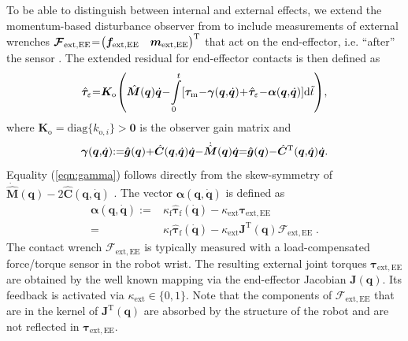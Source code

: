 To be able to distinguish between internal and external effects, we extend the momentum-based disturbance observer from \cite{DeLucaMat2003,DeLucaMat2004,Haddadin2014} to include measurements of external wrenches $\medmuskip=1.3mu
\thinmuskip=1.3mu
\thickmuskip=1.3mu
\bm{\mathcal{F}}_\mathrm{ext,EE}=\begin{pmatrix}\bm{f}_{\mathrm{ext,EE}} & \bm{m}_{\mathrm{ext,EE}}\end{pmatrix}^\mathrm{T}$ that act on the end-effector, i.e. ``after'' the sensor \cite{OttHenLee2013}.
The extended residual for end-effector contacts is then defined as
%
\begin{equation}
\medmuskip=0.5mu
\thinmuskip=0.5mu
\thickmuskip=0.5mu
\hat{\bm{\tau}}_\mathrm{\varepsilon}=\bm{K}_\mathrm{o}
\left(
\hat{\bm{M}}(\bm{q})\dot{\bm{q}}
-\int\limits_0^t
 [\bm{\tau}_\mathrm{m}
 -\bm{\gamma}(\bm{q},\dot{\bm{q}})
 +\hat{\bm{\tau}}_\mathrm{\varepsilon}
 -\bm{\alpha}(\bm{q},\dot{\bm{q}})
 ]\mathrm{d}\tilde{t} 
 \right),
\label{eqn:observer}
\end{equation}
%
where $\bm{K}_\mathrm{o}=\mathrm{diag}\{k_{\mathrm{o},i}\}>\bm{0}$ is the observer gain matrix and
\begin{equation}
\medmuskip=0.05mu
\thinmuskip=0.05mu
\thickmuskip=0.05mu
\bm{\gamma}(\bm{q},\dot{\bm{q}}):=
\hat{\bm{g}}(\bm{q})
+\hat{\bm{C}}(\bm{q},\dot{\bm{q}})\dot{\bm{q}}
-\dot{\hat{\bm{M}}}(\bm{q})\dot{\bm{q}}
=
\hat{\bm{g}}(\bm{q})-\hat{\bm{C}}^\mathrm{T}(\bm{q},\dot{\bm{q}})\dot{\bm{q}}\;.
\label{eqn:gamma}
\end{equation}
Equality (\ref{eqn:gamma}) follows directly from the skew-symmetry of $\dot{\hat{\bm{M}}}(\bm{q})-2\hat{\bm{C}}(\bm{q},\dot{\bm{q}})$ \cite{DeLucaAlbHadHir2006}. 
The vector $\bm{\alpha}(\bm{q},\dot{\bm{q}})$ is defined as 
\begin{equation}
\begin{split}
\bm{\alpha}(\bm{q},\dot{\bm{q}}) :=& 
\kappa_{\mathrm{f}}\hat{\bm{\tau}}_\mathrm{f}(\dot{\bm{q}}) -\kappa_{\mathrm{ext}}\bm{\tau}_{\mathrm{ext,EE}} \\
=&
\kappa_{\mathrm{f}}\hat{\bm{\tau}}_\mathrm{f}(\dot{\bm{q}})
-\kappa_{\mathrm{ext}}\bm{J}^{\mathrm{T}}(\bm{q}) \bm{\mathcal{F}}_\mathrm{ext,EE} \; .
\end{split}
\label{eqn:observer_settings}
\end{equation}
The contact wrench $\bm{\mathcal{F}}_\mathrm{ext,EE}$ is typically measured with a load-compensated force/torque sensor in the robot wrist.
The resulting external joint torques $\bm{\tau}_{\mathrm{ext,EE}}$ are obtained by the well known mapping via the end-effector Jacobian $\bm{J}(\bm{q})$. 
Its feedback is activated via $\kappa_{\mathrm{ext}} \in \{0,1\}$. 
Note that the components of $\bm{\mathcal{F}}_\mathrm{ext,EE}$ that are in the kernel of $\bm{J}^{\mathrm{T}}(\bm{q})$ are absorbed by the structure of the robot and are not reflected in $\bm{\tau}_{\mathrm{ext,EE}}$. 

